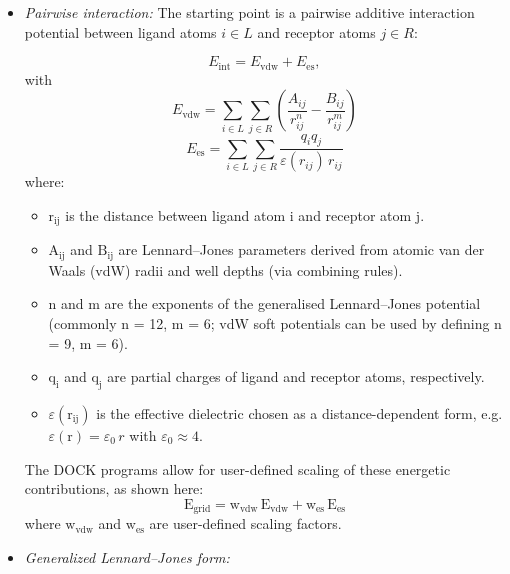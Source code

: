 \documentclass[12pt]{article}
\begin{document}
\begin{itemize}
\item \emph{Pairwise interaction:}
The starting point is a pairwise additive interaction potential between ligand atoms $i \in L$ and receptor atoms $j \in R$:

\begin{equation}
  E_{\textrm{int}} = E_{\textrm{vdw}} + E_{\textrm{es}},
\end{equation}
with
\begin{equation}
  E_{\text{vdw}} =
    \sum_{i \in L} \sum_{j \in R}
    \left(
      \frac{A_{ij}}{r_{ij}^{n}} -
      \frac{B_{ij}}{r_{ij}^{m}}
    \right)
\end{equation}
\begin{equation}
  E_{\text{es}} =
    \sum_{i \in L} \sum_{j \in R}
    \frac{q_i q_j}{\varepsilon(r_{ij})\, r_{ij}}
\end{equation}
where:
\begin{itemize}
  \item $\textrm{r}_\textrm{ij}$ is the distance between ligand atom i and receptor atom j.
  \item $\textrm{A}_\textrm{ij}$ and $\textrm{B}_\textrm{ij}$ are Lennard--Jones parameters derived from atomic van der Waals (vdW) radii and well depths
        (via combining rules).
  \item n and m are the exponents of the generalised Lennard--Jones potential (commonly n = 12, m = 6; vdW soft potentials can be used by defining n = 9, m = 6).
  \item $\textrm{q}_\textrm{i}$ and $\textrm{q}_\textrm{j}$ are partial charges of ligand and receptor atoms, respectively.
  \item \(\varepsilon(\textrm{r}_\textrm{ij})\) is the effective dielectric chosen as a distance-dependent form, e.g.
        \(\varepsilon(\textrm{r}) = \varepsilon_\textrm{0}\, r\) with
        \(\varepsilon_\textrm{0} \approx 4\).
\end{itemize}

The DOCK programs allow for user-defined scaling of these energetic contributions, as shown here:
\begin{equation}
  \textrm{E}_{\textrm{grid}} =
    \textrm{w}_{\textrm{vdw}}\, \textrm{E}_{\textrm{vdw}} +
    \textrm{w}_{\textrm{es}}\, \textrm{E}_{\textrm{es}}
\end{equation}
where $\textrm{w}_{\textrm{vdw}}$ and $\textrm{w}_{\textrm{es}}$ are user-defined scaling factors.

\item \emph{Generalized Lennard--Jones form:}


\end{itemize}
\end{document}
